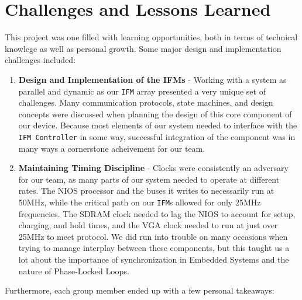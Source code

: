 \documentclass{article}
\begin{document}
\section{Challenges and Lessons Learned}

This project was one filled with learning opportunities, both in terms of technical knowlege as well as
personal growth. Some major design and implementation challenges included:

\begin{enumerate}{}
\item \textbf{Design and Implementation of the IFMs} - Working with a system as parallel and dynamic as our \texttt{IFM} array presented a very unique set of challenges. Many communication protocols, state machines, and design concepts were
discussed when planning the design of this core component of our device. Because most elements of our system needed
to interface with the \texttt{IFM Controller} in some way, successful integration of the component was in many ways a cornerstone acheivement for our team.

\item \textbf{Maintaining Timing Discipline} - Clocks were consistently an adversary for our team, as many parts 
of our system needed to operate at different rates. The NIOS processor and the buses it writes to necessarily run at 50MHz, while the critical path on our \texttt{IFM}s allowed for only 25MHz frequencies. The SDRAM clock needed to lag the NIOS to account for setup, charging, and hold times, and the VGA clock needed to run at just over 25MHz to meet protocol. We did run into trouble on many occasions when trying to manage interplay between these components, but this taught us a lot about the importance of synchronization in Embedded Systems and the nature of Phase-Locked Loops.

\end{enumerate}

Furthermore, each group member ended up with a few personal takeaways:
\end{document}
